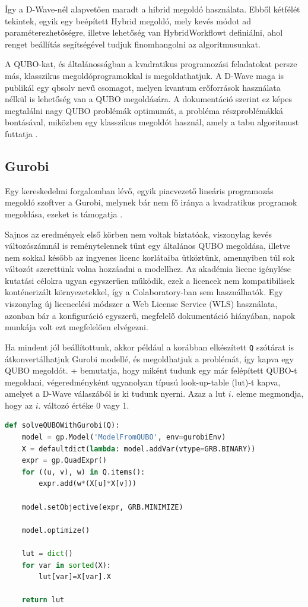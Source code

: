 Így a D-Wave-nél alapvetően maradt a hibrid megoldó használata. Ebből kétfélét tekintek, egyik egy beépített Hybrid megoldó, mely kevés módot ad paraméterezhetőségre, illetve lehetőség van HybridWorkflowt definiálni, ahol renget beállítás segítségével tudjuk finomhangolni az algoritmusunkat.

A QUBO-kat, és általánosságban a kvadratikus programozási feladatokat persze más, klasszikus megoldóprogramokkal is megoldathatjuk. A D-Wave maga is publikál egy qbsolv nevű csomagot, melyen kvantum erőforrások használata nélkül is lehetőség van a QUBO megoldására. A dokumentáció szerint ez képes megtalálni nagy QUBO problémák optimumát, a probléma részproblémákká bontásával, miközben egy klasszikus megoldót használ, amely a tabu algoritmust futtatja \cite{DWaveOceanQbsolv}. 

\subsection{Gurobi}\label{sec:Gurobi}

Egy kereskedelmi forgalomban lévő, egyik piacvezető lineáris programozás megoldó szoftver a Gurobi, melynek bár nem fő iránya a kvadratikus programok megoldása, ezeket is támogatja \cite{gurobi}. 

Sajnos az eredmények első körben nem voltak biztatóak, viszonylag kevés változószámnál is reménytelennek tűnt egy általános QUBO megoldása, illetve nem sokkal később az ingyenes licenc korlátaiba ütköztünk, amennyiben túl sok változót szerettünk volna hozzáadni a modellhez. Az akadémia licenc igénylése kutatási célokra ugyan egyszerűen működik, ezek a licencek nem kompatibilisek konténerizált környezetekkel, így a Colaboratory-ban sem használhatók. Egy viszonylag új licencelési módszer a Web License Service (WLS) használata\cite{gurobiWLS}, azonban bár a konfiguráció egyszerű, megfelelő dokumentáció hiányában, napok munkája volt ezt megfelelően elvégezni\cite{gurobiAcademicColab}.

Ha mindent jól beállítottunk, akkor például a korábban elkészített \verb+Q+ szótárat is átkonvertálhatjuk Gurobi modellé, és megoldhatjuk a problémát, így kapva egy QUBO megoldót. \Az+ bemutatja, hogy miként tudunk egy már felépített QUBO-t megoldani, végeredményként ugyanolyan típusú look-up-table (lut)-t kapva, amelyet a D-Wave válaszából is ki tudunk nyerni. Azaz a lut $i.$ eleme megmondja, hogy az $i.$ változó értéke 0 vagy 1.

\vspace{5pt}
\begin{lstlisting}[language=python,caption=QUBO megoldása Gurobival,label=code:solveQUBOWithGurobi]	
def solveQUBOWithGurobi(Q):
	model = gp.Model('ModelFromQUBO', env=gurobiEnv)
	X = defaultdict(lambda: model.addVar(vtype=GRB.BINARY))
	expr = gp.QuadExpr()
	for ((u, v), w) in Q.items():
		expr.add(w*(X[u]*X[v]))
	
	model.setObjective(expr, GRB.MINIMIZE)
	
	model.optimize()
	
	lut = dict()
	for var in sorted(X):
		lut[var]=X[var].X
	
	return lut
\end{lstlisting}

